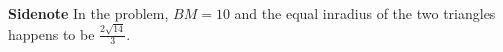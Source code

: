 \begin{enumerate}
 \textbf{Sidenote} In the problem, $BM=10$ and the equal inradius of the two triangles happens to be $\frac {2\sqrt{14}}{3}$.

 


\end{enumerate}